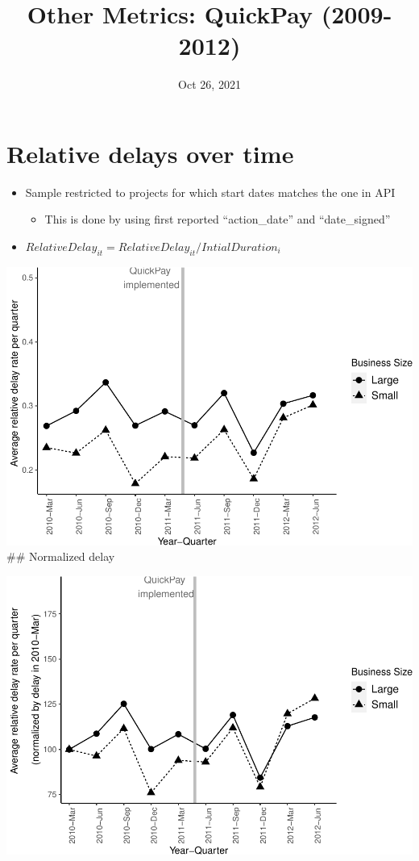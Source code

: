 \documentclass[
]{article}
\title{Other Metrics: QuickPay (2009-2012)}
\author{}
\date{\vspace{-2.5em}Oct 26, 2021}
\providecommand{\tightlist}{%
  \setlength{\itemsep}{0pt}\setlength{\parskip}{0pt}}
\begin{document}
\maketitle

\hypertarget{relative-delays-over-time}{%
\section{Relative delays over time}\label{relative-delays-over-time}}

\begin{itemize}
\tightlist
\item
  Sample restricted to projects for which start dates matches the one in
  API

  \begin{itemize}
  \tightlist
  \item
    This is done by using first reported ``action\_date'' and
    ``date\_signed''
  \end{itemize}
\item
  \(RelativeDelay_{it} = RelativeDelay_{it}/IntialDuration_i\)
\end{itemize}

\includegraphics{qp_first_relative_delay_files/figure-latex/plot_relative_delay-1.pdf}
\#\# Normalized delay

\includegraphics{qp_first_relative_delay_files/figure-latex/normalized_plot-1.pdf}
\end{document}

